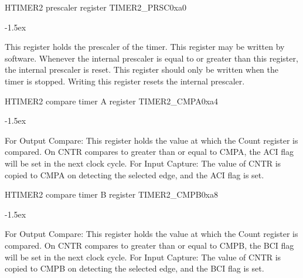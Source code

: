\documentclass[12pt]{article}
\begin{document}
\begin{register}{H}{TIMER2 prescaler register TIMER2\_PRSC}{0xa0}
\label{timer2prsc}
%
\regnewline%
\end{register}
\begin{regdesc}[0.8\textwidth]\begin{reglist}[00000]
\itemsep-1.5ex
\item[PRSC] This register holds the prescaler of the timer. This register may be written by software. Whenever the internal prescaler is equal to or greater than this register, the internal prescaler is reset. This register should only be written when the timer is stopped. Writing this register resets the internal prescaler.
\end{reglist}\end{regdesc}

\begin{register}{H}{TIMER2 compare timer A register TIMER2\_CMPA}{0xa4}
\label{timer2cmpa}
%
\regnewline%
\end{register}
\begin{regdesc}[0.8\textwidth]\begin{reglist}[00000]
\itemsep-1.5ex
\item[CMPA] For Output Compare: This register holds the value at which the Count register is compared. On CNTR compares to greater than or equal to CMPA, the ACI flag will be set in the next clock cycle. For Input Capture: The value of CNTR is copied to CMPA on detecting the selected edge, and the ACI flag is set.
\end{reglist}\end{regdesc}

\begin{register}{H}{TIMER2 compare timer B register TIMER2\_CMPB}{0xa8}
\label{timer2cmpb}
%
\regnewline%
\end{register}
\begin{regdesc}[0.8\textwidth]\begin{reglist}[00000]
\itemsep-1.5ex
\item[CMPB] For Output Compare: This register holds the value at which the Count register is compared. On CNTR compares to greater than or equal to CMPB, the BCI flag will be set in the next clock cycle. For Input Capture: The value of CNTR is copied to CMPB on detecting the selected edge, and the BCI flag is set.
\end{reglist}\end{regdesc}
\end{document}
